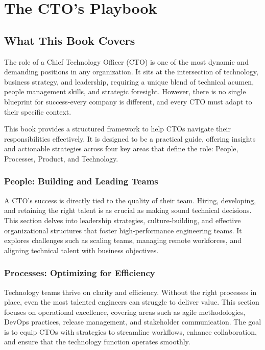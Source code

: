 \chapter{The CTO's Playbook}


\section{What This Book Covers}

The role of a Chief Technology Officer (CTO) is one of the most dynamic and demanding positions in any organization. It sits at the intersection of technology, business strategy, and leadership, requiring a unique blend of technical acumen, people management skills, and strategic foresight. However, there is no single blueprint for success-every company is different, and every CTO must adapt to their specific context.

This book provides a structured framework to help CTOs navigate their responsibilities effectively. It is designed to be a practical guide, offering insights and actionable strategies across four key areas that define the role: People, Processes, Product, and Technology.

\subsection{People: Building and Leading Teams}

A CTO's success is directly tied to the quality of their team. Hiring, developing, and retaining the right talent is as crucial as making sound technical decisions. This section delves into leadership strategies, culture-building, and effective organizational structures that foster high-performance engineering teams. It explores challenges such as scaling teams, managing remote workforces, and aligning technical talent with business objectives.

\subsection{Processes: Optimizing for Efficiency}

Technology teams thrive on clarity and efficiency. Without the right processes in place, even the most talented engineers can struggle to deliver value. This section focuses on operational excellence, covering areas such as agile methodologies, DevOps practices, release management, and stakeholder communication. The goal is to equip CTOs with strategies to streamline workflows, enhance collaboration, and ensure that the technology function operates smoothly.


